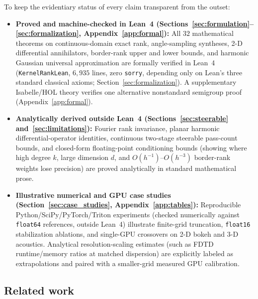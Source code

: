 \documentclass[11pt,a4paper]{article}
\theoremstyle{plain}
\theoremstyle{definition}
\begin{document}
To keep the evidentiary status of every claim transparent from the outset:
\begin{itemize}[leftmargin=1.8em,itemsep=2pt]
  \item \textbf{Proved and machine-checked in Lean~4 (Sections~\ref{sec:formulation}--\ref{sec:formalization}, Appendix~\ref{app:formal}):} All $32$ mathematical theorems on continuous-domain exact rank, angle-sampling syntheses, 2-D differential annihilators, border-rank upper and lower bounds, and harmonic Gaussian universal approximation are formally verified in Lean~4 (\texttt{KernelRankLean}, $6{,}935$ lines, zero \texttt{sorry}, depending only on Lean's three standard classical axioms; Section~\ref{sec:formalization}). A supplementary Isabelle/HOL theory verifies one alternative nonstandard semigroup proof (Appendix~\ref{app:formal}).
  \item \textbf{Analytically derived outside Lean~4 (Sections~\ref{sec:steerable} and~\ref{sec:limitations}):} Fourier rank invariance, planar harmonic differential-operator identities, continuous two-stage steerable pass-count bounds, and closed-form floating-point conditioning bounds (showing where high degree $k$, large dimension $d$, and $O(h^{-1})\text{--}O(h^{-3})$ border-rank weights lose precision) are proved analytically in standard mathematical prose.
  \item \textbf{Illustrative numerical and GPU case studies (Section~\ref{sec:case_studies}, Appendix~\ref{app:tables}):} Reproducible Python/SciPy/PyTorch/Triton experiments (checked numerically against \texttt{float64} references, outside Lean~4) illustrate finite-grid truncation, \texttt{float16} stabilization ablations, and single-GPU crossovers on 2-D bokeh and 3-D acoustics. Analytical resolution-scaling estimates (such as FDTD runtime/memory ratios at matched dispersion) are explicitly labeled as extrapolations and paired with a smaller-grid measured GPU calibration.
\end{itemize}

\subsection{Related work}\label{sec:related}
\end{document}
